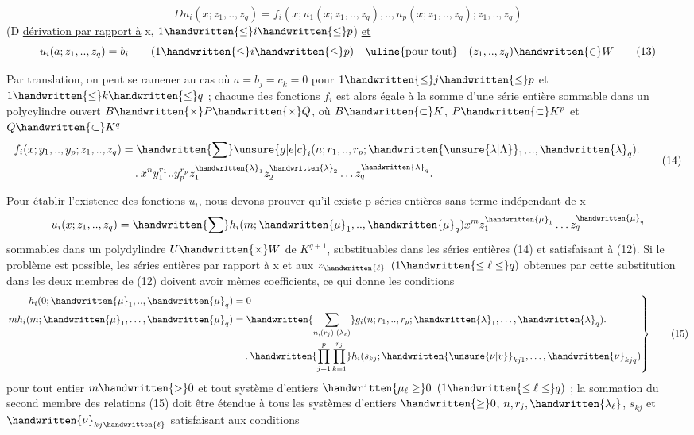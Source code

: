 \[
Du_i(x;z_1,..,z_q)=f_i(x;u_1(x;z_1,..,z_q),..,u_p(x;z_1,..,z_q);z_1,..,z_q)\tag*{(12)}
\]
(D \uline{dérivation par rapport à} x, $1\handwritten{\leq}i\handwritten{\leq}p$) \uline{et}
\[
u_i(a;z_1,..,z_q)=b_i\qquad(1\handwritten{\leq}i\handwritten{\leq}p)\quad\text{\uline{pour tout}}\quad(z_1,..,z_q)\handwritten{\in}W\tag*{(13)}
\]

Par translation, on peut se ramener au cas où $a=b_j=c_k=0$ pour $1\handwritten{\leq}j\handwritten{\leq}p$ et $1\handwritten{\leq}k\handwritten{\leq}q$ ; chacune des fonctions $f_i$ est alors égale à la somme d'une série entière sommable dans un polycylindre ouvert $B\handwritten{\times}P\handwritten{\times}Q$, où $B\handwritten{\subset}K$, $P\handwritten{\subset}K^p$ et $Q\handwritten{\subset}K^q$
\[
\begin{aligned}
f_i(x;y_1,..,y_p;z_1,..,z_q)&=\handwritten{\sum}\unsure{g|e|c}_i(n;r_1,..,r_p;\handwritten{\unsure{\lambda|\Lambda}}_1,..,\handwritten{\lambda}_q)\mathbin{.}\\
&\quad\mathbin{.}x^n y_1^{r_1}..y_p^{r_p}z_1^{\handwritten{\lambda}_1}z_2^{\handwritten{\lambda}_2}\ldots z_q^{\handwritten{\lambda}_q}.
\end{aligned}\tag*{(14)}
\]

Pour établir l'existence des fonctions $u_i$, nous devons prouver qu'il existe p séries entières sans terme indépendant de x
\[
u_i(x;z_1,..,z_q)=\handwritten{\sum}h_i(m;\handwritten{\mu}_1,..,\handwritten{\mu}_q)x^m z_1^{\handwritten{\mu}_1}\ldots z_q^{\handwritten{\mu}_q}
\]
sommables dans un polydylindre $U\handwritten{\times}W$ de $K^{q+1}$, substituables dans les séries entières (14) et satisfaisant à (12). Si le problème est possible, les séries entières par rapport à x et aux $z_{\handwritten{\ell}}$ $(1\handwritten{\leq\ell\leq}q)$ obtenues par cette substitution dans les deux membres de (12) doivent avoir mêmes coefficients, ce qui donne les conditions
\[
\left.\begin{aligned}
h_i(0;\handwritten{\mu}_1,..,\handwritten{\mu}_q)&=0\\
mh_i(m;\handwritten{\mu}_1,\ldots,\handwritten{\mu}_q)&=\handwritten{\sum_{n,(r_j),(\lambda_\ell)}}g_i(n;r_1,..,r_p;\handwritten{\lambda}_1,\ldots,\handwritten{\lambda}_q)\mathbin{.}\\
&\quad\mathbin{.}\handwritten{\prod_{j=1}^p\prod_{k=1}^{r_j}}h_i(s_{kj};\handwritten{\unsure{\nu|v}}_{kj1},\ldots,\handwritten{\nu}_{kjq})
\end{aligned}\right\}\tag*{(15)}
\]
pour tout entier $m\handwritten{>}0$ et tout système d'entiers $\handwritten{\mu_\ell\geq}0$ $(1\handwritten{\leq\ell\leq}q)$ ; la sommation du second membre des relations (15) doit être étendue à tous les systèmes d'entiers $\handwritten{\geq}0$, $n,r_j,\handwritten{\lambda_\ell}$, $s_{kj}$ et $\handwritten{\nu}_{kj\handwritten{\ell}}$ satisfaisant aux conditions

